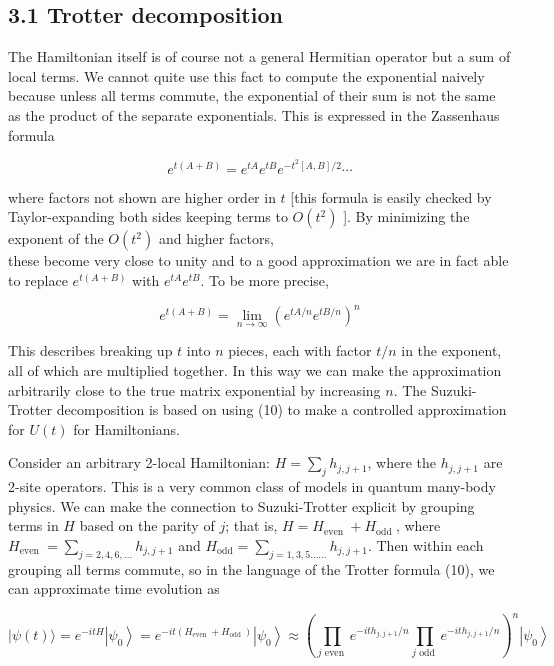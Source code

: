 \documentclass[12pt]{article}
\begin{document}
\subsection*{3.1 Trotter decomposition}
The Hamiltonian itself is of course not a general Hermitian operator but a sum of local terms. We cannot quite use this fact to compute the exponential naively because unless all terms commute, the exponential of their sum is not the same as the product of the separate exponentials. This is expressed in the Zassenhaus formula


\begin{equation*}
e^{t(A+B)}=e^{t A} e^{t B} e^{-t^{2}[A, B] / 2} \cdots \tag{9}
\end{equation*}


where factors not shown are higher order in $t$ [this formula is easily checked by Taylor-expanding both sides keeping terms to $O\left(t^{2}\right)$ ]. By minimizing the exponent of the $O\left(t^{2}\right)$ and higher factors,\\
these become very close to unity and to a good approximation we are in fact able to replace $e^{t(A+B)}$ with $e^{t A} e^{t B}$. To be more precise,


\begin{equation*}
e^{t(A+B)}=\lim _{n \rightarrow \infty}\left(e^{t A / n} e^{t B / n}\right)^{n} \tag{10}
\end{equation*}


This describes breaking up $t$ into $n$ pieces, each with factor $t / n$ in the exponent, all of which are multiplied together. In this way we can make the approximation arbitrarily close to the true matrix exponential by increasing $n$. The Suzuki-Trotter decomposition is based on using (10) to make a controlled approximation for $U(t)$ for Hamiltonians.

Consider an arbitrary 2-local Hamiltonian: $H=\sum_{j} h_{j, j+1}$, where the $h_{j, j+1}$ are 2-site operators. This is a very common class of models in quantum many-body physics. We can make the connection to Suzuki-Trotter explicit by grouping terms in $H$ based on the parity of $j$; that is, $H=H_{\text {even }}+H_{\text {odd }}$, where $H_{\text {even }}=\sum_{j=2,4,6, \ldots} h_{j, j+1}$ and $H_{\mathrm{odd}}=\sum_{j=1,3,5 \ldots \ldots} h_{j, j+1}$. Then within each grouping all terms commute, so in the language of the Trotter formula (10), we can approximate time evolution as


\begin{equation*}
|\psi(t)\rangle=e^{-i t H}\left|\psi_{0}\right\rangle=e^{-i t\left(H_{\text {even }}+H_{\text {odd }}\right)}\left|\psi_{0}\right\rangle \approx\left(\prod_{j \text { even }} e^{-i t h_{j, j+1} / n} \prod_{j \text { odd }} e^{-i t h_{j, j+1} / n}\right)^{n}\left|\psi_{0}\right\rangle \tag{11}
\end{equation*}
\end{document}
